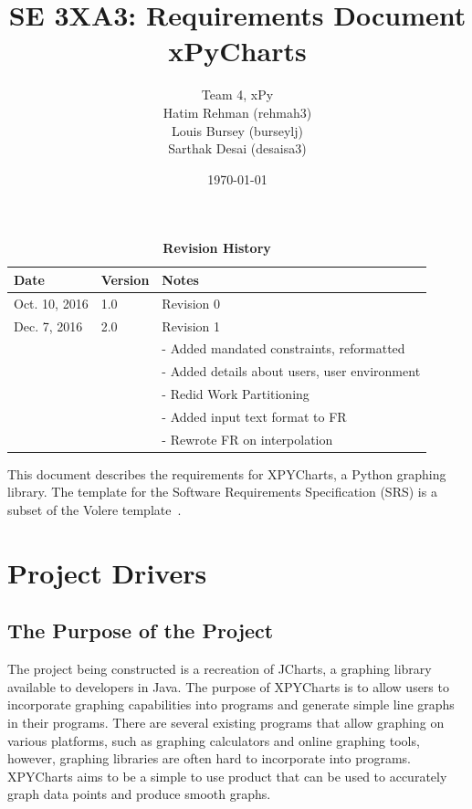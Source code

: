 \documentclass[12pt, titlepage]{article}
\title{SE 3XA3: Requirements Document\\xPyCharts}
\author{Team 4, xPy
		\\ Hatim Rehman (rehmah3)
		\\ Louis Bursey (burseylj)
		\\ Sarthak Desai (desaisa3)
}
\date{\today}
\begin{document}
\maketitle

\tableofcontents
\listoftables
\listoffigures

\begin{table}[bp]
\caption{\bf Revision History}
\begin{tabularx}{\textwidth}{p{3cm}p{2cm}X}
\toprule {\bf Date} & {\bf Version} & {\bf Notes}\\
\midrule
Oct. 10, 2016 & 1.0 & Revision 0\\
Dec. 7, 2016 &  2.0 & Revision 1 \\
 & & - Added mandated constraints, reformatted \\
 & & - Added details about users, user environment \\
 & & - Redid Work Partitioning \\
 & & - Added input text format to FR \\
 & & - Rewrote FR on interpolation \\
\bottomrule
\end{tabularx}
\end{table}

\newpage


This document describes the requirements for XPYCharts, a Python graphing library.  The template for the Software
Requirements Specification (SRS) is a subset of the Volere
template~\citep{RobertsonAndRobertson2012}.  

\section{Project Drivers}

\subsection{The Purpose of the Project}
The project being constructed is a recreation of JCharts, a graphing library available to developers in Java. The purpose of XPYCharts is to allow users to incorporate graphing capabilities into programs and generate simple line graphs in their programs. There are several existing programs that allow graphing on various platforms, such as graphing calculators and online graphing tools, however, graphing libraries are often hard to incorporate into programs. XPYCharts aims to be a simple to use product that can be used to accurately graph data points and produce smooth graphs.
\end{document}
